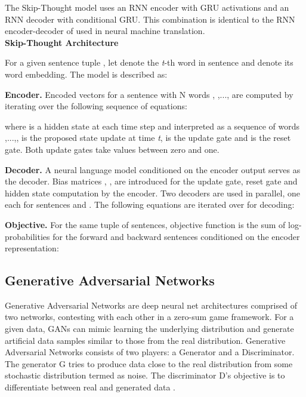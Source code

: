 \documentclass[11pt,a4paper]{article}
\begin{document}
The Skip-Thought model uses an RNN encoder with GRU activations \cite{gru}  
and an RNN decoder with conditional GRU. This combination is identical
to the RNN encoder-decoder of  used in neural machine translation.\\



\noindent \textbf{Skip-Thought Architecture}

\noindent For a given sentence tuple ,
let  denote the \textit{t}-th word in sentence  and  denote its word embedding.
The model is described as:

\textbf{Encoder.} Encoded vectors for a sentence  with N words , ,..., are computed by iterating over the following sequence of equations:


where  is a hidden state at each time step and 
interpreted as a sequence 
of words ,...,, 
is the proposed state update at time \textit{t}, 
is the update gate and  is the reset gate.
Both update gates take values between zero and one.



\textbf{Decoder.} 
A neural language model conditioned on the encoder output  serves as the decoder. Bias matrices , ,  are introduced for the update gate, reset gate and hidden state computation by the encoder. Two decoders are used in parallel, one each for sentences  and . 
The following equations are iterated over for decoding:


\textbf{Objective.} 
For the same tuple of sentences, objective function is the sum of log-probabilities 
for the forward and backward sentences conditioned on the encoder representation:


\subsection{Generative Adversarial Networks}

Generative Adversarial Networks \cite{GAN}
are deep neural net architectures comprised of two networks,
contesting with each other in a zero-sum game framework.
For a given data, GANs can mimic learning the underlying distribution and generate artificial
data samples similar to those from the real distribution. Generative Adversarial
Networks consists of two players: a Generator and a Discriminator. The generator G
tries to produce data close to the real distribution  from some  
stochastic distribution  termed as noise. The discriminator D's
objective is to differentiate between real and generated data .
\end{document}
